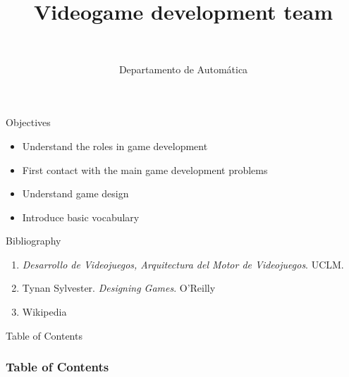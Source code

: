 \documentclass[10pt,compress]{beamer} %
\title[Videogame development team]{Videogame development team}
\author{\asignatura\\\carrera}
\institute{}
\date{Departamento de Automática}
\begin{document}
{\titlepageBlue
    \begin{frame}
        \titlepage
    \end{frame}
}

\institute{\asignatura}

\begin{frame}[plain]{}
   \begin{block}{Objectives}
   \begin{itemize}
        \item Understand the roles in game development
        \item First contact with the main game development problems
        \item Understand game design
		\item Introduce basic vocabulary
	\end{itemize}
	\end{block}

   \begin{block}{Bibliography}
      \begin{enumerate}
          \item  \textit{Desarrollo de Videojuegos, Arquitectura del Motor de Videojuegos}. UCLM.
          \item Tynan Sylvester. \textit{Designing Games}. O'Reilly
          \item Wikipedia
      \end{enumerate} 
   \end{block}
\end{frame}

{
\begin{frame}[shrink]{Table of Contents}
 \frametitle{Table of Contents}
 \tableofcontents
\end{frame}
}
\end{document}
